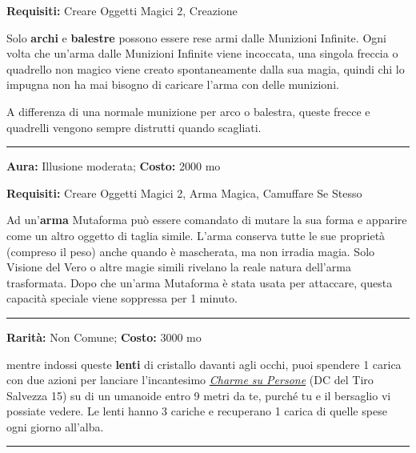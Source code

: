 \begin{multicols}{2}
\textbf{Requisiti:} Creare Oggetti Magici 2, Creazione

Solo \textbf{archi} e \textbf{balestre} possono essere rese armi dalle Munizioni Infinite. Ogni volta che un'arma dalle Munizioni Infinite viene incoccata, una singola freccia o quadrello non magico viene creato spontaneamente dalla sua magia, quindi chi lo impugna non ha mai bisogno di caricare l'arma con delle munizioni.

A differenza di una normale munizione per arco o balestra, queste frecce e quadrelli vengono sempre distrutti quando scagliati.

\smallskip\noindent\rule{\linewidth}{2pt}  \hypertarget{Mutaforma}{}\medskip{}\noindent\label{Mutaforma}

\textbf{Aura:} Illusione moderata; \textbf{Costo:} 2000 mo

\textbf{Requisiti:} Creare Oggetti Magici 2, Arma Magica, Camuffare Se Stesso

Ad un'\textbf{arma} Mutaforma può essere comandato di mutare la sua forma e apparire come un altro oggetto di taglia simile. L'arma conserva tutte le sue proprietà (compreso il peso) anche quando è mascherata, ma non irradia magia. Solo Visione del Vero o altre magie simili rivelano la reale natura dell'arma trasformata. Dopo che un'arma Mutaforma è stata usata per attaccare, questa capacità speciale viene soppressa per 1 minuto.

\smallskip\noindent\rule{\linewidth}{2pt}  \hypertarget{OcchiAffascinanti}{}\medskip{}\noindent\label{OcchiAffascinanti}

\textbf{Rarità:} Non Comune; \textbf{Costo:} 3000 mo

mentre indossi queste \textbf{lenti} di cristallo davanti agli occhi, puoi spendere 1 carica con due azioni per lanciare l'incantesimo \emph{\hyperlink{Charme su Persone}{Charme su Persone}} (DC del Tiro Salvezza 15) su di un umanoide entro 9 metri da te, purché tu e il bersaglio vi possiate vedere. Le lenti hanno 3 cariche e recuperano 1 carica di quelle spese ogni giorno all'alba.

\smallskip\noindent\rule{\linewidth}{2pt}  \hypertarget{Occhidell'Aquila}{}\medskip{}\noindent\label{Occhidell'Aquila}


\end{multicols}
